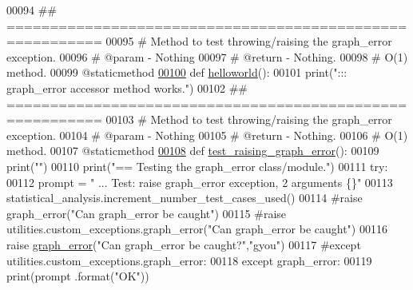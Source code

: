 \begin{DoxyCode}
00094     \textcolor{comment}{## =========================================================}
00095     \textcolor{comment}{#   Method to test throwing/raising the graph\_error exception.}
00096     \textcolor{comment}{#   @param - Nothing}
00097     \textcolor{comment}{#   @return - Nothing.}
00098     \textcolor{comment}{#   O(1) method.}
00099     @staticmethod
\hypertarget{graph__error__tester_8py_source_l00100}{}\hyperlink{classutilities_1_1custom__exceptions_1_1graph__error__tester_1_1graph__error__tester_a59e456a82b205066fe96b206ba70411f}{00100}     \textcolor{keyword}{def }\hyperlink{classutilities_1_1custom__exceptions_1_1graph__error__tester_1_1graph__error__tester_a59e456a82b205066fe96b206ba70411f}{helloworld}():
00101         print(\textcolor{stringliteral}{":::  graph\_error accessor method works."})
00102     \textcolor{comment}{## =========================================================}
00103     \textcolor{comment}{#   Method to test throwing/raising the graph\_error exception.}
00104     \textcolor{comment}{#   @param - Nothing}
00105     \textcolor{comment}{#   @return - Nothing.}
00106     \textcolor{comment}{#   O(1) method.}
00107     @staticmethod
\hypertarget{graph__error__tester_8py_source_l00108}{}\hyperlink{classutilities_1_1custom__exceptions_1_1graph__error__tester_1_1graph__error__tester_a844b0064bc87b5d840f5cf3f54d99240}{00108}     \textcolor{keyword}{def }\hyperlink{classutilities_1_1custom__exceptions_1_1graph__error__tester_1_1graph__error__tester_a844b0064bc87b5d840f5cf3f54d99240}{test\_raising\_graph\_error}():
00109         print(\textcolor{stringliteral}{""})
00110         print(\textcolor{stringliteral}{"==   Testing the graph\_error class/module."})
00111         \textcolor{keywordflow}{try}:
00112             prompt = \textcolor{stringliteral}{"  ... Test: raise graph\_error exception, 2 arguments  \{\}"}
00113             statistical\_analysis.increment\_number\_test\_cases\_used()
00114             \textcolor{comment}{#raise graph\_error("Can graph\_error be caught")}
00115             \textcolor{comment}{#raise utilities.custom\_exceptions.graph\_error("Can graph\_error be caught")}
00116             \textcolor{keywordflow}{raise} \hyperlink{classutilities_1_1custom__exceptions_1_1graph__error_1_1graph__error}{graph\_error}(\textcolor{stringliteral}{"Can graph\_error be caught?"},\textcolor{stringliteral}{"gyou"})
00117         \textcolor{comment}{#except utilities.custom\_exceptions.graph\_error:}
00118         \textcolor{keywordflow}{except} graph\_error:
00119             print(prompt .format(\textcolor{stringliteral}{"OK"}))

\end{DoxyCode}
